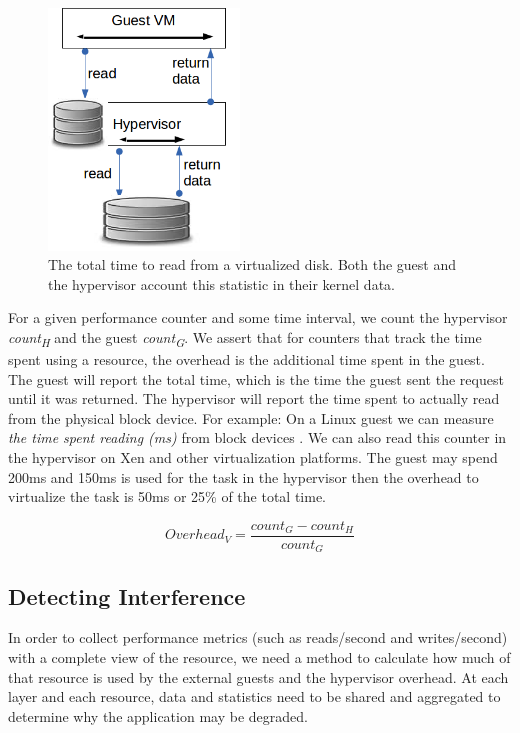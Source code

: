 \begin{figure}[!h]
  \begin{center}
  \includegraphics[width=2in]{images/ReadOperation.png}
  \caption{The total time to read from a virtualized disk.  Both the guest and the hypervisor account this statistic in their kernel data.}
  \label{readOp}
  \end{center}
\end{figure}

\indent For a given performance counter and some time interval, we count the hypervisor \emph{count\textsubscript{H}} and the guest \emph{count\textsubscript{G}}.  
We assert that for counters that track the time spent using a resource, the overhead is the additional time spent in the guest.    
The guest will report the total time, which is the time the guest sent the request until it was returned.
The hypervisor will report the time spent to actually read from the physical block device.
For example:  On a Linux guest we can measure \emph{the time spent reading (ms)} from block devices \cite{diskstats}.  We can also read this counter in the hypervisor on Xen and other virtualization platforms.
The guest may spend 200ms and 150ms is used for the task in the hypervisor then the overhead to virtualize the task is 50ms or 25\% of the total time.

\begin{equation}
  Overhead_V = \frac{count_G - count_H}{count_G} 
\end{equation}

\subsection{Detecting Interference}
In order to collect performance metrics (such as reads/second and writes/second) with a complete view of the resource, we need a method to calculate how much of that resource is used by the external guests and the hypervisor overhead.  
At each layer and each resource, data and statistics need to be shared and aggregated to determine why the application may be degraded.

